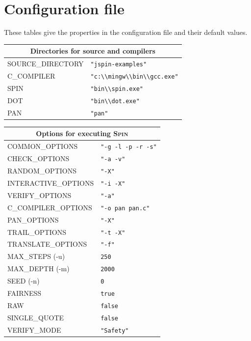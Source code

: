 \documentclass[11pt]{article}
\newcommand{\spn}{\textsc{Spin}}
\begin{document}
\section{Configuration file}\label{a.cfg}

These tables give the properties in the configuration file and their
default values.

\begin{center}

\begin{tabular}{|p{}|p{}|}
\hline
\multicolumn{2}{|c|}{Directories for source and compilers}\\ \hline
\textsc{\ttfamily SOURCE\_DIRECTORY} & \verb+"jspin-examples"+ \\
\textsc{\ttfamily C\_COMPILER} &\verb+"c:\\mingw\\bin\\gcc.exe"+ \\
\textsc{\ttfamily SPIN} &\verb+"bin\\spin.exe"+ \\
\textsc{\ttfamily DOT} &\verb+"bin\\dot.exe"+ \\
\textsc{\ttfamily PAN} &\verb+"pan"+ \\ \hline
\end{tabular}

\bigskip

\begin{tabular}{|p{}|p{}|}
\hline
\multicolumn{2}{|c|}{Options for executing \spn{}}\\ \hline
\textsc{\ttfamily COMMON\_OPTIONS} &\verb+"-g -l -p -r -s"+\\
\textsc{\ttfamily CHECK\_OPTIONS} &\verb+"-a -v"+\\
\textsc{\ttfamily RANDOM\_OPTIONS} &\verb+"-X"+\\
\textsc{\ttfamily INTERACTIVE\_OPTIONS} &\verb+"-i -X"+\\
\textsc{\ttfamily VERIFY\_OPTIONS} &\verb+"-a"+\\
\textsc{\ttfamily C\_COMPILER\_OPTIONS} &\verb+"-o pan pan.c"+\\
\textsc{\ttfamily PAN\_OPTIONS} &\verb+"-X"+\\
\textsc{\ttfamily TRAIL\_OPTIONS} &\verb+"-t -X"+\\
\textsc{\ttfamily TRANSLATE\_OPTIONS} &\verb+"-f"+\\
\textsc{\ttfamily MAX\_STEPS} {\ttfamily (-u)} &     \verb+250+\\
\textsc{\ttfamily MAX\_DEPTH} {\ttfamily (-m)} &     \verb+2000+\\
\textsc{\ttfamily SEED} {\ttfamily (-n)} &     \verb+0+\\
\textsc{\ttfamily FAIRNESS} &      \verb+true+\\
\textsc{\ttfamily RAW} & \verb+false+\\
\textsc{\ttfamily SINGLE\_QUOTE} &      \verb+false+\\
\textsc{\ttfamily VERIFY\_MODE} &   \verb+"Safety"+\\\hline
\end{tabular}


\end{center}
\end{document}
